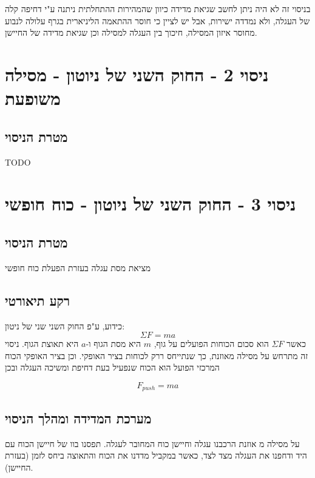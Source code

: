 \documentclass[14pt]{extarticle}
\begin{document}
בניסוי זה לא היה ניתן לחשב שגיאת מדידה כיוון שהמהירות ההתחלתית ניתנה ע"י דחיפה קלה של העגלה, ולא נמדדה ישירות,  אבל יש לציין כי חוסר ההתאמה הליניארית בגרף עלולה לנבוע מחוסר איזון המסילה, חיכוך בין העגלה למסילה וכן שגיאת מדידה של החיישן.

\section*{ניסוי 2 - החוק השני של ניוטון - מסילה משופעת}
\subsection*{מטרת הניסוי}
TODO

\section*{ניסוי 3 - החוק השני של ניוטון - כוח  חופשי}
\subsection*{מטרת הניסוי}
מציאת מסת עגלה בעזרת הפעלת כוח חופשי
\subsection*{רקע תיאורטי}   
כידוע, ע"פ החוק השני שני של ניטון:
\begin{equation}
\Sigma F = m a
\end{equation}
כאשר $\Sigma F$ הוא סכום הכוחות הפועלים על גוף, $m$ היא מסת הגוף ו-$a$ היא תאוצת הגוף.
ניסוי זה מתרחש על מסילה מאוזנת, כך שנתייחס ררק לכוחות בציר האופקי.
וכן בציר האופקי הכוח המרכזי הפועל הוא הכוח שנפעיל בעת דחיפת ומשיכה העגלה ובכן

\begin{equation}
F_{push} = m a
\end{equation}
\subsection*{מערכת המדידה ומהלך הניסוי}
על  מסילה מ אוזנת הרכבנו עגלה וחיישן כוח המחובר לעגלה.
תפסנו בוו של  חיישן הכוח עם היד ודחפנו את העגלה מצד לצד, כאשר במקביל מדדנו  את הכוח והתאוצה  ביחס לזמן (בעזרת החיישן).
\end{document}
